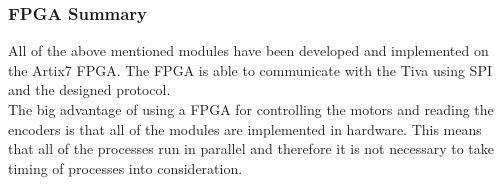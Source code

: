 \documentclass[../../../main]{subfiles}
\begin{document}
\subsubsection{FPGA Summary}
All of the above mentioned modules have been developed and implemented on the Artix7 FPGA.
The FPGA is able to communicate with the Tiva using SPI and the designed protocol.
\\
The big advantage of using a FPGA for controlling the motors and reading the encoders is that all of the modules are implemented in hardware.
This means that all of the processes run in parallel and therefore it is not necessary to take timing of processes into consideration.
\end{document}
